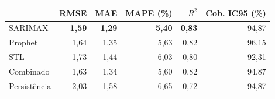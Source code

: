 \begin{tabular}{lrrrrr}
\toprule
 & RMSE & MAE & MAPE (\%) & $R^2$ & Cob. IC95 (\%) \\
\midrule
SARIMAX & \textbf{1,59} & \textbf{1,29} & \textbf{5,40} & \textbf{0,83} & 94,87 \\
Prophet & 1,64 & 1,35 & 5,63 & 0,82 & 96,15 \\
STL & 1,73 & 1,44 & 6,03 & 0,80 & 92,31 \\
Combinado & 1,63 & 1,34 & 5,60 & 0,82 & 94,87 \\
Persistência & 2,03 & 1,58 & 6,65 & 0,72 & 94,87 \\
\bottomrule
\end{tabular}
